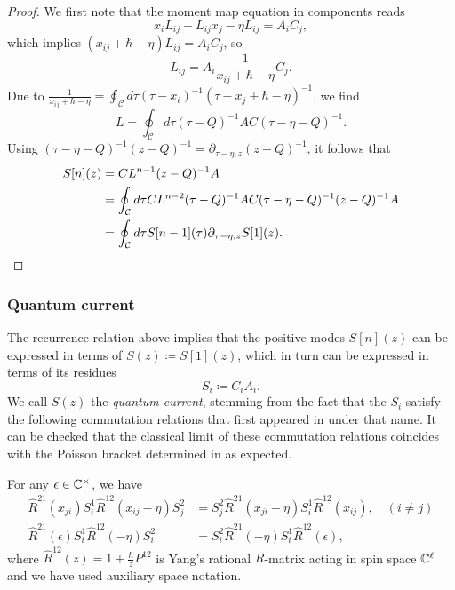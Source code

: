 \begin{proof}
We first note that the moment map equation in components reads
\begin{equation*}
x_i L_{ij} - L_{ij} x_j - \eta L_{ij} = A_i C_j,
\end{equation*}
which implies $(x_{ij}+\hbar-\eta) L_{ij} = A_i C_j$, so
\begin{equation*}
L_{ij} = A_i \frac{1}{x_{ij}+\hbar-\eta} C_j.
\end{equation*}
Due to $\frac{1}{x_{ij}+\hbar-\eta} = \oint_\mathcal{C} d\tau (\tau-x_i)^{-1} (\tau-x_j+\hbar-\eta)^{-1}$, we find
\begin{equation*}
L = \oint_\mathcal{C} d\tau (\tau-Q)^{-1} AC (\tau-\eta-Q)^{-1}.
\end{equation*}
Using $(\tau-\eta-Q)^{-1} (z-Q)^{-1} = \partial_{\tau-\eta,z} (z-Q)^{-1}$, it follows that
\begin{align*}
S[n](z)
&= CL^{n-1} (z-Q)^{-1} A \\
&= \oint_\mathcal{C} d\tau CL^{n-2} (\tau-Q)^{-1} AC (\tau-\eta-Q)^{-1} (z-Q)^{-1} A \\
&= \oint_\mathcal{C} d\tau S[n-1](\tau) \partial_{\tau-\eta,z} S[1](z).\qedhere
\end{align*}
\end{proof}

\subsubsection{Quantum current}

The recurrence relation above implies that the positive modes $S[n](z)$ can be expressed in terms of $S(z) \coloneq S[1](z)$, which in turn can be expressed in terms of its residues
\begin{equation}
S_i \coloneq C_i A_i.
\end{equation}
We call $S(z)$ the \emph{quantum current}, stemming from the fact that the $S_i$ satisfy the following commutation relations that first appeared in \cite{reshetikhin_central_1990} under that name. It can be checked that the classical limit of these commutation relations coincides with the Poisson bracket determined in \cite{arutyunov_hamiltonian_1998} as expected.

\begin{prop}
For any $\epsilon \in \mathbb{C}^\times$, we have
\begin{align}\label{eq:SSrelation}
\hat R^{21}(x_{ji}) S_i^1 \hat R^{12}(x_{ij}-\eta) S_j^2 &= S_j^2 \hat R^{21}(x_{ji}-\eta) S_i^1 \hat R^{12}(x_{ij}), \quad (i \neq j) \\ \label{eq:SSrelation2}
\hat R^{21}(\epsilon) S_i^1 \hat R^{12}(-\eta) S_i^2 &= S_i^2 \hat R^{21}(-\eta) S_i^1 \hat R^{12}(\epsilon),
\end{align}
where $\hat R^{12}(z) = 1+\frac{\hbar}{z} P^{12}$ is Yang's rational $R$-matrix acting in spin space $\mathbb{C}^\ell$ and we have used auxiliary space notation.
\end{prop}

